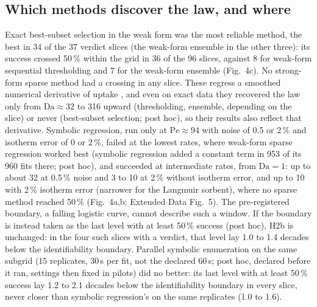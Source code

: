 \documentclass[11pt]{article}
\newcommand{\Da}{\mathrm{Da}}
\newcommand{\Pe}{\mathrm{Pe}}
\begin{document}
\subsection*{Which methods discover the law, and where}
Exact best-subset selection in the weak form was the most reliable method, the best in 34 of the 37
verdict slices (the weak-form ensemble in the other three): its success crossed 50\,\% within the
grid in 36 of the 96 slices, against 8 for weak-form sequential
thresholding and 7 for the weak-form ensemble (Fig.~4c). No strong-form sparse
method had a crossing in any slice. These regress a smoothed numerical derivative of uptake \citep{wentz2023}, and
even on exact data they recovered the law only from $\Da \approx 32$ to 316 upward (thresholding,
ensemble, depending on the slice) or never (best-subset selection; post hoc), so their results
also reflect that derivative. Symbolic
regression, run only at $\Pe \approx 94$ with noise of 0.5 or 2\,\% and isotherm error
of 0 or 2\,\%, failed at the lowest rates, where weak-form sparse regression worked best
(symbolic regression added a constant term in 953 of its 960 fits there; post hoc), and succeeded at intermediate rates,
from $\Da = 1$: up to about 32 at 0.5\,\% noise and 3 to 10 at 2\,\% without isotherm error, and up to
10 with 2\,\% isotherm error (narrower for the Langmuir sorbent),
where no sparse method reached 50\,\% (Fig.~4a,b; Extended Data Fig.~5). The pre-registered
boundary, a falling logistic curve, cannot describe such a window. If the boundary is instead taken
as the last level with at least 50\,\% success (post hoc), H2b is unchanged: in the four such
slices with a verdict, that level lay 1.0 to 1.4 decades below the identifiability boundary.
Parallel symbolic enumeration \citep{ruan2026} on the same subgrid (15 replicates, 30\,s per fit, not
the declared 60\,s; post hoc, declared before it ran, settings then fixed in pilots) did no better: its last level with at least
50\,\% success lay 1.2 to 2.1 decades below
the identifiability boundary in every slice, never closer than symbolic regression's on the same
replicates (1.0 to 1.6).

\end{document}
